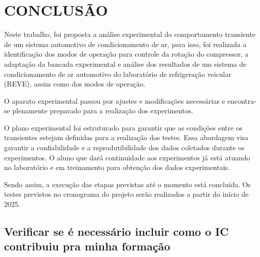 \section{CONCLUSÃO}

Neste trabalho, foi proposta a análise experimental do comportamento transiente de um sistema automotivo de condicionamento de ar, para isso, foi realizada a identificação dos modos de operação para controle da rotação do compressor, a adaptação da bancada experimental e análise dos resultados de um sistema de condicionamento de ar automotivo do laboratório de refrigeração veicular (REVE), assim como dos modos de operação. 

O aparato experimental passou por ajustes e modificações necessárias e encontra-se plenamente preparado para a realização dos experimentos.

O plano experimental foi estruturado para garantir que as condições entre os transientes estejam definidas para a realização dos testes. Essa abordagem visa garantir a confiabilidade e a reprodutibilidade dos dados coletados durante os experimentos. O aluno que dará continuidade aos experimentos já está atuando no laboratório e em treinamento para obtenção dos dados experimentais.
    
Sendo assim, a execução das etapas previstas até o momento está concluída. Os testes previstos no cronograma do projeto serão realizados a partir do início de 2025.

\subsection{Verificar se é necessário incluir como o IC contribuiu pra minha formação}
